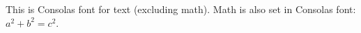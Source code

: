 \documentclass{article}
\begin{document}
This is Consolas font for text (excluding math). Math is also set in Consolas font: $a^2 + b^2 = c^2$.
\end{document}

